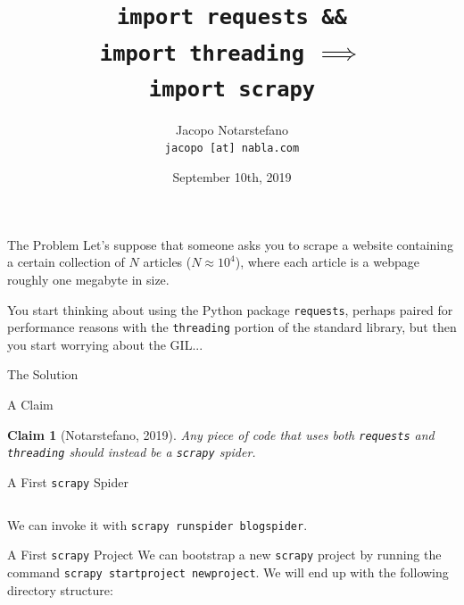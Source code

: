 \documentclass[12pt]{beamer}
\title{
  \texttt{import requests \&\&}\\
  \texttt{import threading} \(\implies\)\\
  \texttt{import scrapy}
}
\author[Jacopo Notarstefano]{
  Jacopo Notarstefano\\
  \texttt{jacopo [at] nabla.com}
}
\date{September 10th, 2019}
\newtheorem{claim}{Claim}
\begin{document}
  \begin{frame}[plain]
    \titlepage
  \end{frame}

  \begin{frame}{The Problem}
    Let's suppose that someone asks you to scrape a website containing a
    certain collection of \(N\) articles (\(N \approx 10^4\)), where each
    article is a webpage roughly one megabyte in size.

    \vspace{0.5cm}

    You start thinking about using the Python package \texttt{requests},
    perhaps paired for performance reasons with the \texttt{threading}
    portion of the standard library, but then you start worrying about
    the GIL...
  \end{frame}

  \begin{frame}{The Solution}
    \begin{figure}
      \centering
    \end{figure}
  \end{frame}

  \begin{frame}{A Claim}
    \begin{claim}[Notarstefano, 2019]
      Any piece of code that uses both \textup{\texttt{requests}} and
      \textup{\texttt{threading}} should instead be a \textup{\texttt{scrapy}}
      spider.
    \end{claim}
  \end{frame}

  \begin{frame}{A First \texttt{scrapy} Spider}
    \inputminted[fontsize=\scriptsize]{python}{tex/src/blogspider.py}

    \vspace{0.5cm}

    We can invoke it with \texttt{scrapy runspider blogspider}.
  \end{frame}

  \begin{frame}{A First \texttt{scrapy} Project}
    We can bootstrap a new \texttt{scrapy} project by running the command
    \texttt{scrapy startproject newproject}. We will end up with the following
    directory structure:

    \vspace{0.5cm}

    \inputminted[fontsize=\scriptsize]{shell-session}{tex/src/tree}
  \end{frame}
\end{document}
